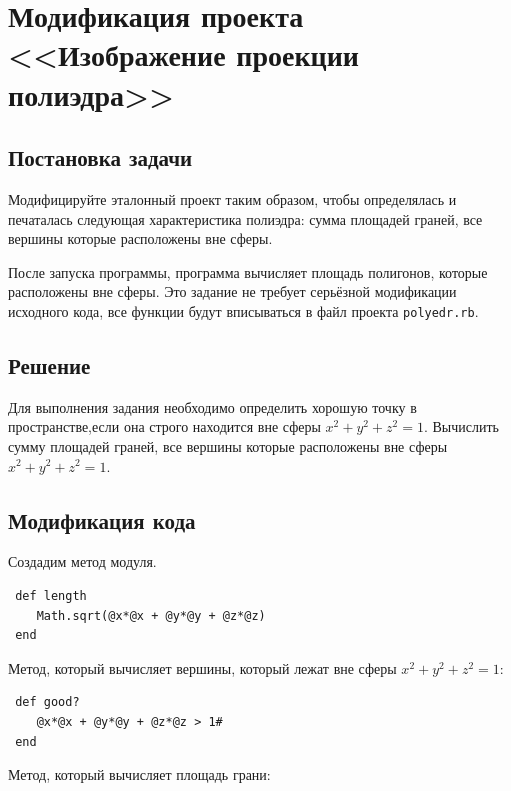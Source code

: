 \section{Модификация проекта <<Изображение проекции полиэдра>>}

\subsection{Постановка задачи}

Модифицируйте эталонный проект таким образом, чтобы определялась и печаталась следующая характеристика полиэдра: сумма площадей граней, все вершины которые расположены вне сферы.

После запуска программы, программа вычисляет площадь полигонов, которые расположены вне сферы.
Это задание не требует серьёзной модификации исходного кода, все функции будут вписываться в файл проекта \verb|polyedr.rb|.

\subsection{Решение}

Для выполнения задания необходимо определить хорошую точку в пространстве,если она строго находится вне сферы $x^2+y^2+z^2=1$.  Вычислить сумму площадей граней, все вершины которые расположены вне сферы $x^2+y^2+z^2=1$.



\subsection{Модификация кода}

Создадим метод модуля.

\begin{small}
\begin{verbatim}
 def length
    Math.sqrt(@x*@x + @y*@y + @z*@z)
 end
\end{verbatim}
\end{small}

Метод, который вычисляет вершины, который лежат вне сферы $x^2+y^2+z^2=1$:

\begin{small}
\begin{verbatim}
 def good?
    @x*@x + @y*@y + @z*@z > 1#
 end
\end{verbatim}
\end{small}


Метод, который вычисляет площадь грани:

